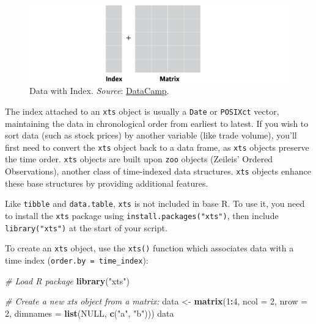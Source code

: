 \documentclass[
]{book}
\newenvironment{Shaded}{\begin{snugshade}}{\end{snugshade}}
\newcommand{\AttributeTok}[1]{\textcolor[rgb]{0.13,0.29,0.53}{#1}}
\newcommand{\CommentTok}[1]{\textcolor[rgb]{0.56,0.35,0.01}{\textit{#1}}}
\newcommand{\ConstantTok}[1]{\textcolor[rgb]{0.56,0.35,0.01}{#1}}
\newcommand{\DecValTok}[1]{\textcolor[rgb]{0.00,0.00,0.81}{#1}}
\newcommand{\FunctionTok}[1]{\textcolor[rgb]{0.13,0.29,0.53}{\textbf{#1}}}
\newcommand{\NormalTok}[1]{#1}
\newcommand{\OtherTok}[1]{\textcolor[rgb]{0.56,0.35,0.01}{#1}}
\newcommand{\SpecialCharTok}[1]{\textcolor[rgb]{0.81,0.36,0.00}{\textbf{#1}}}
\newcommand{\StringTok}[1]{\textcolor[rgb]{0.31,0.60,0.02}{#1}}
\begin{document}
\begin{figure}
\centering
\includegraphics{files/matrixwithindex-wide.png}
\caption{\label{fig:matrix-with-index}Data with Index. \emph{Source}: \href{https://learn.datacamp.com/courses/manipulating-time-series-data-with-xts-and-zoo-in-r}{DataCamp}.}
\end{figure}

The index attached to an \texttt{xts} object is usually a \texttt{Date} or \texttt{POSIXct} vector, maintaining the data in chronological order from earliest to latest. If you wish to sort data (such as stock prices) by another variable (like trade volume), you'll first need to convert the \texttt{xts} object back to a data frame, as \texttt{xts} objects preserve the time order. \texttt{xts} objects are built upon \texttt{zoo} objects (Zeileis' Ordered Observations), another class of time-indexed data structures. \texttt{xts} objects enhance these base structures by providing additional features.

Like \texttt{tibble} and \texttt{data.table}, \texttt{xts} is not included in base R. To use it, you need to install the \texttt{xts} package using \texttt{install.packages("xts")}, then include \texttt{library("xts")} at the start of your script.

To create an \texttt{xts} object, use the \texttt{xts()} function which associates data with a time index (\texttt{order.by\ =\ time\_index}):

\begin{Shaded}
\begin{Highlighting}[]
\CommentTok{\# Load R package}
\FunctionTok{library}\NormalTok{(}\StringTok{"xts"}\NormalTok{)}

\CommentTok{\# Create a new xts object from a matrix:}
\NormalTok{data }\OtherTok{\textless{}{-}} \FunctionTok{matrix}\NormalTok{(}\DecValTok{1}\SpecialCharTok{:}\DecValTok{4}\NormalTok{, }\AttributeTok{ncol =} \DecValTok{2}\NormalTok{, }\AttributeTok{nrow =} \DecValTok{2}\NormalTok{, }\AttributeTok{dimnames =} \FunctionTok{list}\NormalTok{(}\ConstantTok{NULL}\NormalTok{, }\FunctionTok{c}\NormalTok{(}\StringTok{"a"}\NormalTok{, }\StringTok{"b"}\NormalTok{)))}
\NormalTok{data}
\end{Highlighting}
\end{Shaded}
\end{document}
